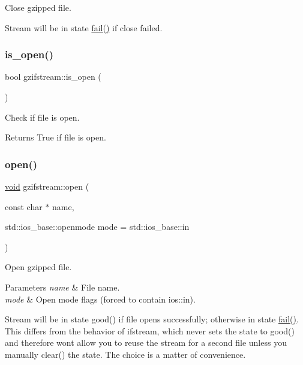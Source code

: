 Close gzipped file. 

Stream will be in state \hyperlink{_constraint_macros_8h_a73a3b169ac8c3419cbe15327e75ffcfd}{fail()} if close failed. \mbox{\label{classgzifstream_a8e9de13b311b698ef0ccc276b71c7941}} 
\subsubsection{\texorpdfstring{is\+\_\+open()}{is\_open()}}
{\footnotesize\ttfamily bool gzifstream\+::is\+\_\+open (\begin{DoxyParamCaption}{ }\end{DoxyParamCaption})\hspace{0.3cm}{\ttfamily [inline]}}



Check if file is open. 

\begin{DoxyReturn}{Returns}
True if file is open. 
\end{DoxyReturn}
\mbox{\label{classgzifstream_a8105f9300d36dafbe8b10c204583f5a1}} 
\subsubsection{\texorpdfstring{open()}{open()}}
{\footnotesize\ttfamily \hyperlink{lp__lib_8h_ac7828c7b2b31d2e11af17bdb6289c5d9}{void} gzifstream\+::open (\begin{DoxyParamCaption}\item[{const char $\ast$}]{name,  }\item[{std\+::ios\+\_\+base\+::openmode}]{mode = {\ttfamily std\+:\+:ios\+\_\+base\+:\+:in} }\end{DoxyParamCaption})}



Open gzipped file. 


\begin{DoxyParams}{Parameters}
{\em name} & File name. \\
\hline
{\em mode} & Open mode flags (forced to contain ios\+::in).\\
\hline
\end{DoxyParams}
Stream will be in state good() if file opens successfully; otherwise in state \hyperlink{_constraint_macros_8h_a73a3b169ac8c3419cbe15327e75ffcfd}{fail()}. This differs from the behavior of ifstream, which never sets the state to good() and therefore won\textquotesingle{}t allow you to reuse the stream for a second file unless you manually clear() the state. The choice is a matter of convenience. \mbox{\label{classgzifstream_a1c5a0ab4f99f8d8e3406af7bfd82b133}} 
